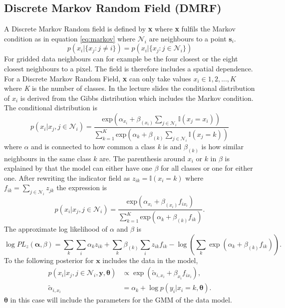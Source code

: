 \documentclass[a4paper,english]{article}
\begin{document}
\subsection{Discrete Markov Random Field (DMRF)}
A Discrete Markov Random field is defined by \textbf{x} where \textbf{x} fulfils the Markov condition as in equation \ref{eq:markov} where $\mathcal{N}_i$ are neighbours to a point $\textbf{s}_i$.
\begin{equation}
	p(x_i|\{x_j : j\neq i\}) = p(x_i|\{x_j : j\in \mathcal{N}_i\})
	\label{eq:markov}
\end{equation}
For gridded data neighbours can for example be the four closest or the eight closest neighbours to a pixel.
The field is therefore includes a spatial dependence. For a Discrete Markov Random Field, \textbf{x} can only take values $x_i \in 1,2,...,K$ where \textit{K} is the number of classes. In the lecture slides the conditional distribution of $x_i$ is derived from the Gibbs distribution which includes the Markov condition. The conditional distribution is
\begin{equation}
  p(x_i|x_j,j\in \mathcal{N}_i) = \dfrac{\text{exp}(\alpha_{x_i}+\beta_{(x_i)}\sum_{j\in \mathcal{N}_i}\mathds{I}(x_j = x_i))}{\sum^K_{k=1}\text{exp}(\alpha_k + \beta_{(k)}\sum_{j\in \mathcal{N}_i}\mathds{I}(x_j = k))}
\end{equation}
where $\alpha$ and is connected to how common a class \textit{k} is and $\beta_{(k)}$ is how similar neighbours in the same class $k$ are. The parenthesis around $x_i$ or $k$ in $\beta$ is explained by that the model can either have one $\beta$ for all classes or one for either one. After rewriting the indicator field as $z_{ik} = \mathds{I}(x_i = k)$ where $f_{ik} = \sum_{j\in \mathcal{N}_i} z_{jk}$ the expression is
\begin{equation}
  p(x_i|x_j,j\in \mathcal{N}_i) = \dfrac{\text{exp}(\alpha_{x_i}+\beta_{(x_i)} f_{ix_i})}{\sum^K_{k=1}\text{exp}(\alpha_k + \beta_{(k)} f_{ik})}.
\end{equation}
The approximate log likelihood of $\alpha$ and $\beta$ is
\begin{equation}
  \log PL_z(\boldsymbol{\alpha},\beta) = \sum_k \sum_i \alpha_{k} z_{ik} + \sum_k \beta_{(k)} \sum_i z_{ik}f_{ik} - \log(\sum_k \exp(\alpha_{k} + \beta_{(k)} f_{ik})).
\end{equation}
To the following posterior for $\boldsymbol{x}$ includes the data in the model,
\begin{equation}
  \begin{split}
    p(x_i|x_j,j\in \mathcal{N}_i, \boldsymbol{y}, \boldsymbol{\theta}) &\propto \exp (\tilde{\alpha}_{i, x_i}+\beta_{x_i} f_{ix_i}), \\
    \tilde{\alpha}_{i, x_i} &= \alpha_k + \log p(y_i | x_i = k, \boldsymbol{\theta}).
  \end{split}
\end{equation}
$\boldsymbol{\theta}$ in this case will include the parameters for the GMM of the data model.
\end{document}
